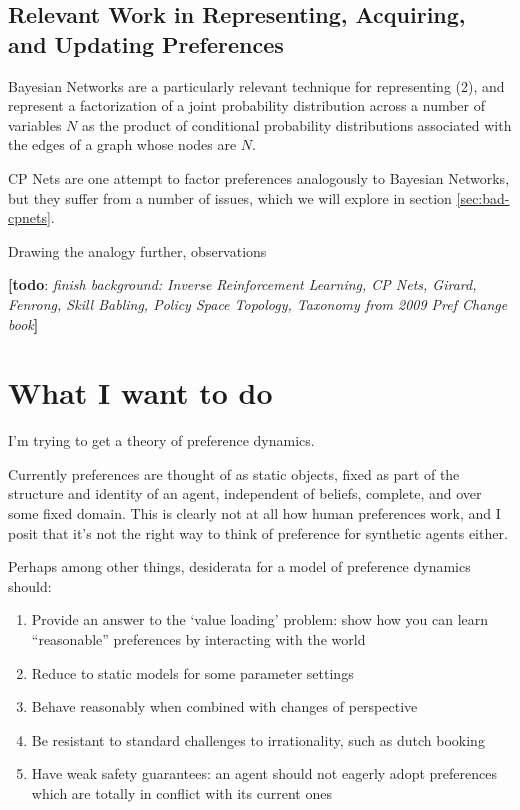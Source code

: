 \documentclass{article}
\theoremstyle{plain}
\theoremstyle{definition}
\theoremstyle{remark}
\newcommand{\todo}[1]{{\color{red}\large\textbf{[todo}: {\normalsize\itshape#1}\textbf{]}}}
\begin{document}
	\subsection*{Relevant Work in Representing, Acquiring, and Updating Preferences}
	
	
	Bayesian Networks are a particularly relevant technique for representing (2), and represent a factorization of a joint probability distribution across a number of variables $N$ as the product of conditional probability distributions associated with the edges of a graph whose nodes are $N$.	
	
	

	 CP Nets \cite{boutilier2004cp} are one attempt to factor preferences analogously to Bayesian Networks, but they suffer from a number of issues, which we will explore in section \ref{sec:bad-cpnets}. 
	
	
	Drawing the analogy further, observations 	
	
	\todo{finish background: Inverse Reinforcement Learning, CP Nets, Girard, Fenrong, Skill Babling, Policy Space Topology, Taxonomy from 2009 Pref Change book}
	
	
	
	\section{What I want to do}
	I'm trying to get a theory of preference dynamics.
	
	Currently preferences are thought of as static objects, fixed as part of the structure and identity of an agent, independent of beliefs, complete, and over some fixed domain. This is clearly not at all how human preferences work, and I posit that it's not the right way to think of preference for synthetic agents either.
	
	Perhaps among other things, desiderata for a model of preference dynamics should:
	\begin{enumerate}[noitemsep]
		\item Provide an answer to the `value loading' problem: show how you can learn ``reasonable'' preferences by interacting with the world
		\item Reduce to static models for some parameter settings
		\item Behave reasonably when combined with changes of perspective 
		\item Be resistant to standard challenges to irrationality, such as dutch booking
		\item Have weak safety guarantees: an agent should not eagerly adopt preferences which are totally in conflict with its current ones
	\end{enumerate}
	
\end{document}
